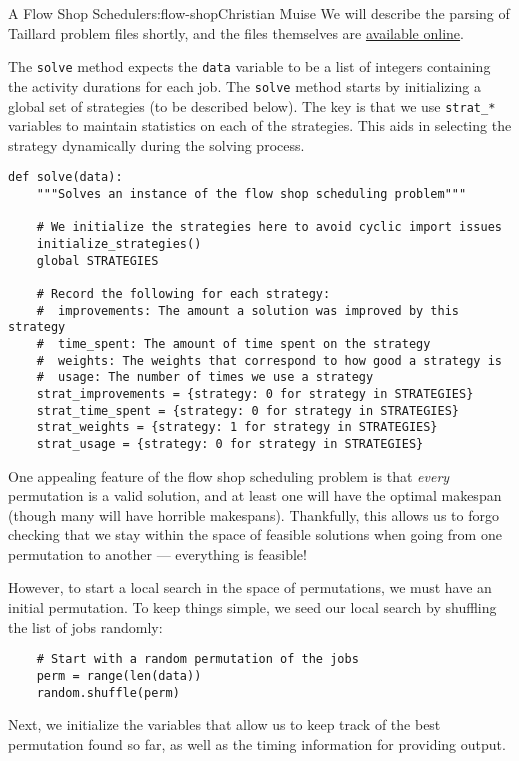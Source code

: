 \begin{aosachapter}{A Flow Shop Scheduler}{s:flow-shop}{Christian Muise}
We will describe the parsing of Taillard problem files shortly, and the
files themselves are
\href{http://mistic.heig-vd.ch/taillard/problemes.dir/ordonnancement.dir/ordonnancement.html}{available
online}.

The \texttt{solve} method expects the \texttt{data} variable to be a
list of integers containing the activity durations for each job. The
\texttt{solve} method starts by initializing a global set of strategies
(to be described below). The key is that we use \texttt{strat\_*}
variables to maintain statistics on each of the strategies. This aids in
selecting the strategy dynamically during the solving process.

\begin{verbatim}
def solve(data):
    """Solves an instance of the flow shop scheduling problem"""

    # We initialize the strategies here to avoid cyclic import issues
    initialize_strategies()
    global STRATEGIES

    # Record the following for each strategy:
    #  improvements: The amount a solution was improved by this strategy
    #  time_spent: The amount of time spent on the strategy
    #  weights: The weights that correspond to how good a strategy is
    #  usage: The number of times we use a strategy
    strat_improvements = {strategy: 0 for strategy in STRATEGIES}
    strat_time_spent = {strategy: 0 for strategy in STRATEGIES}
    strat_weights = {strategy: 1 for strategy in STRATEGIES}
    strat_usage = {strategy: 0 for strategy in STRATEGIES}
\end{verbatim}

One appealing feature of the flow shop scheduling problem is that
\emph{every} permutation is a valid solution, and at least one will have
the optimal makespan (though many will have horrible makespans).
Thankfully, this allows us to forgo checking that we stay within the
space of feasible solutions when going from one permutation to another
--- everything is feasible!

However, to start a local search in the space of permutations, we must
have an initial permutation. To keep things simple, we seed our local
search by shuffling the list of jobs randomly:

\begin{verbatim}
    # Start with a random permutation of the jobs
    perm = range(len(data))
    random.shuffle(perm)
\end{verbatim}

Next, we initialize the variables that allow us to keep track of the
best permutation found so far, as well as the timing information for
providing output.


\end{aosachapter}
